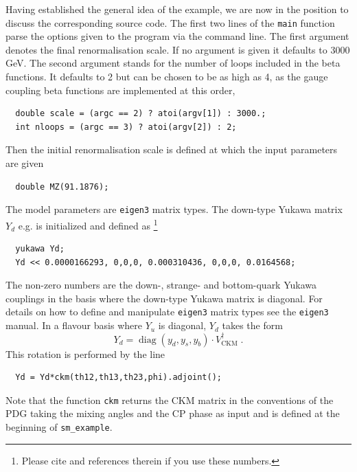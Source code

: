 \documentclass[11pt,a4paper]{article}
\begin{document}
Having established the general idea of the example, we are now in the position to discuss the corresponding source code.
The first two lines of the \texttt{main} function parse the options given to the program via the command line. The first argument denotes the final renormalisation scale. If no argument is given it defaults to 3000 GeV. The
second argument stands for the number of loops included in the beta functions. It defaults to 2 but can be chosen to be as high as 4, as the gauge coupling beta functions are implemented at this order,
\begin{lstlisting}
  double scale = (argc == 2) ? atoi(argv[1]) : 3000.;
  int nloops = (argc == 3) ? atoi(argv[2]) : 2;
\end{lstlisting}
Then the initial renormalisation scale is defined at which the input parameters are given
\begin{lstlisting}
  double MZ(91.1876);
\end{lstlisting}
The model parameters are \texttt{eigen3} matrix types. The down-type Yukawa matrix $Y_d$ e.g. is initialized and defined as \footnote{Please cite \cite{Deppisch:2018flu} and references therein if you use these numbers.}
\begin{lstlisting}
  yukawa Yd; 
  Yd << 0.0000166293, 0,0,0, 0.000310436, 0,0,0, 0.0164568;
\end{lstlisting}
The non-zero numbers are the down-, strange- and bottom-quark Yukawa couplings in the basis where the down-type Yukawa matrix is diagonal.
For details on how to define and manipulate  \texttt{eigen3} matrix types see the \texttt{eigen3} manual. In a flavour basis where $Y_u$ is diagonal, $Y_d$ takes the form
\begin{equation}
    Y_d = \operatorname{diag}(y_d,y_s,y_b) \cdot V_{\mathrm{CKM}}^\dagger\;.
\end{equation}
This rotation is performed by the line
\begin{lstlisting}
  Yd = Yd*ckm(th12,th13,th23,phi).adjoint();
\end{lstlisting}
Note that the function \texttt{ckm} returns the CKM matrix in the conventions of the PDG \cite{Patrignani:2016xqp} taking the mixing angles and the CP phase as input and is defined at the beginning of \texttt{sm\_example}.
\end{document}
